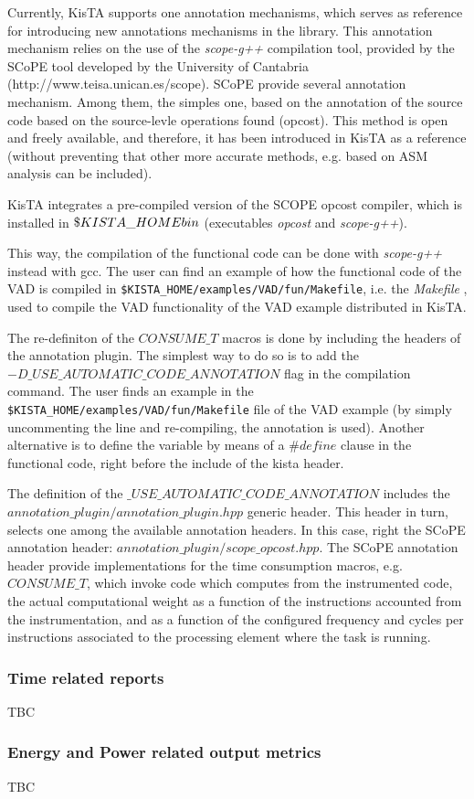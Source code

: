 Currently, KisTA supports one annotation mechanisms, which serves as reference for introducing
new annotations mechanisms in the library.
%
This annotation mechanism relies on the use of the \emph{scope-g++} compilation tool,
provided by the SCoPE tool developed by the University of Cantabria (http://www.teisa.unican.es/scope).
%
SCoPE provide several annotation mechanism.
Among them, the simples one, based on the annotation of the source code
based on the source-levle operations found (opcost).
This method is open and freely available, and therefore, it has been introduced in KisTA
as a reference (without preventing that other more accurate methods, e.g. based on ASM analysis
can be included).

KisTA integrates a pre-compiled version of the SCOPE opcost compiler, which is
installed in $\$KISTA\_HOME\\bin$ (executables \emph{opcost} and \emph{scope-g++}).

This way, the compilation of the functional code can be done with \emph{scope-g++} instead with gcc.
The user can find an example of how the functional code of the VAD is compiled in
{\tt \$KISTA\_HOME/examples/VAD/fun/Makefile}, i.e. the \emph{Makefile} , used to compile
the VAD functionality of the VAD example distributed in KisTA.

The re-definiton of the $CONSUME\_T$ macros is done by including the headers of the annotation plugin.
The simplest way to do so is to add the $-D\_USE\_AUTOMATIC\_CODE\_ANNOTATION$ flag in the 
compilation command.
The user finds an example in the
{\tt \$KISTA\_HOME/examples/VAD/fun/Makefile}
file of the
VAD example (by simply uncommenting the line and re-compiling, the annotation is used).
%
Another alternative is to define the variable by means of a $\#define$ clause in the 
functional code, right before the include of the kista header.

The definition of the $\_USE\_AUTOMATIC\_CODE\_ANNOTATION$ includes the 
$annotation\_plugin/annotation\_plugin.hpp$ generic header. 
This header in turn, selects one among the available annotation headers.
In this case, right the SCoPE annotation header:
$annotation\_plugin/scope\_opcost.hpp$.
%
The SCoPE annotation header provide implementations for the time consumption
macros, e.g. $CONSUME\_T$, which invoke code which computes from the instrumented
code, the actual computational weight as a function of the instructions accounted from the instrumentation,
and as a function of the configured frequency and cycles per instructions associated to the processing element
where the task is running.

\subsubsection{Time related reports}
TBC

\subsubsection{Energy and Power related output metrics}
TBC



